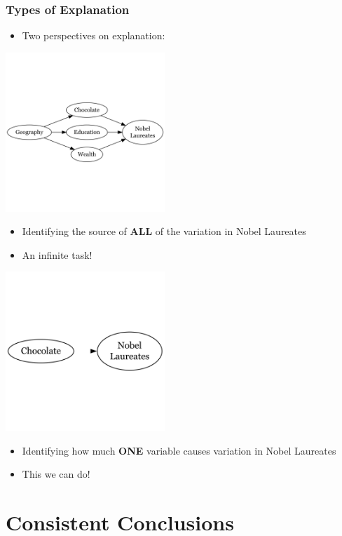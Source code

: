 \documentclass[xcolor=x11names,compress]{beamer}\usepackage[]{graphicx}\usepackage[]{xcolor}
\renewcommand{\(}{\begin{columns}}
\renewcommand{\)}{\end{columns}}
\newcommand{\<}[1]{\begin{column}{#1}}
\renewcommand{\>}{\end{column}}
\begin{document}
\begin{frame}
\frametitle{Types of Explanation}
\begin{itemize}
\item Two perspectives on explanation:
\end{itemize}
\begin{multicols}{2}

\includegraphics[width=0.45\textwidth]{graph8.png}
\begin{itemize}
\item Identifying the source of \textbf{ALL} of the variation in Nobel Laureates
\item An infinite task!
\end{itemize}
\columnbreak

\includegraphics[width=0.45\textwidth]{graph9.png}
\begin{itemize}
\item Identifying how much \textbf{ONE} variable causes variation in Nobel Laureates
\item This we can do!
\end{itemize}
\end{multicols}
\end{frame}

\section{Consistent Conclusions}
\end{document}
